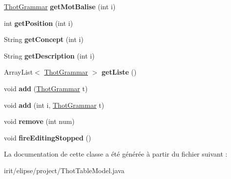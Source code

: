 \begin{DoxyCompactItemize}
\mbox{\hyperlink{classfr_1_1irit_1_1elipse_1_1project_1_1_thot_grammar}{Thot\+Grammar}} {\bfseries get\+Mot\+Balise} (int i)
\item 
\mbox{\label{classfr_1_1irit_1_1elipse_1_1project_1_1_thot_table_model_a0877a14c332421b1916a0509f2a648d4}} 
int {\bfseries get\+Position} (int i)
\item 
\mbox{\label{classfr_1_1irit_1_1elipse_1_1project_1_1_thot_table_model_a50d2012af0cd1b313306a81bfc1869cd}} 
String {\bfseries get\+Concept} (int i)
\item 
\mbox{\label{classfr_1_1irit_1_1elipse_1_1project_1_1_thot_table_model_ac1466a5dd90c31424558bb6762fe0ee4}} 
String {\bfseries get\+Description} (int i)
\item 
\mbox{\label{classfr_1_1irit_1_1elipse_1_1project_1_1_thot_table_model_a8ec6796e9a90dde4cc5f9381c17571ee}} 
Array\+List$<$ \mbox{\hyperlink{classfr_1_1irit_1_1elipse_1_1project_1_1_thot_grammar}{Thot\+Grammar}} $>$ {\bfseries get\+Liste} ()
\item 
\mbox{\label{classfr_1_1irit_1_1elipse_1_1project_1_1_thot_table_model_a1ffc773c8e58402cf94ea4690d547c5e}} 
void {\bfseries add} (\mbox{\hyperlink{classfr_1_1irit_1_1elipse_1_1project_1_1_thot_grammar}{Thot\+Grammar}} t)
\item 
\mbox{\label{classfr_1_1irit_1_1elipse_1_1project_1_1_thot_table_model_aa849b14c5e54cc534447015436b7371c}} 
void {\bfseries add} (int i, \mbox{\hyperlink{classfr_1_1irit_1_1elipse_1_1project_1_1_thot_grammar}{Thot\+Grammar}} t)
\item 
\mbox{\label{classfr_1_1irit_1_1elipse_1_1project_1_1_thot_table_model_a887784519aaa76cd36c6baac30545454}} 
void {\bfseries remove} (int num)
\item 
\mbox{\label{classfr_1_1irit_1_1elipse_1_1project_1_1_thot_table_model_a2ad00784caa25fd58ca98f9abe9cab50}} 
void {\bfseries fire\+Editing\+Stopped} ()
\end{DoxyCompactItemize}


La documentation de cette classe a été générée à partir du fichier suivant \+:\begin{DoxyCompactItemize}
\item 
irit/elipse/project/Thot\+Table\+Model.\+java\end{DoxyCompactItemize}
